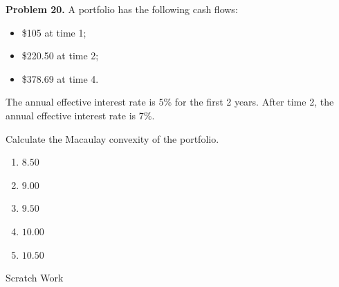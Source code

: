 \documentclass[12pt]{article}
\begin{document}
\newpage

\noindent \textbf{Problem 20.}
A portfolio has the following cash flows:

\begin{itemize}
\item \$105 at time 1;
\item \$220.50 at time 2;
\item \$378.69 at time 4.
\end{itemize}

The annual effective interest rate is $5\%$ for the first 2 years. After time 2, the annual effective interest rate is $7\%$.

Calculate the Macaulay convexity of the portfolio.

\vspace{.5cm}

\begin{enumerate}[label = \Alph*.]
\item $8.50$
\item $9.00$
\item $9.50$
\item $10.00$
\item $10.50$
\end{enumerate}

\newpage


Scratch Work
\end{document}
